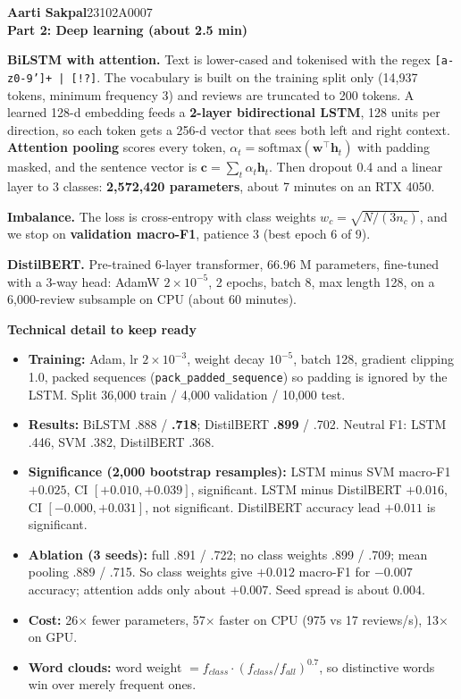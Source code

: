 \documentclass[10pt,a4paper]{article}
\newcommand{\lab}[1]{{\color{accent}\bfseries #1}}
\newcommand{\speaker}[3]{%
  \begin{tcolorbox}[colback=navy,colframe=navy,arc=3pt,left=8pt,right=8pt,top=4pt,bottom=4pt]
  {\color{white}\bfseries\Large #1}\hfill{\color{white!70!navy}\small #2}\\[1pt]{\color{accent!60!white}\bfseries #3}
  \end{tcolorbox}\vspace{-2pt}}
\begin{document}
\speaker{Aarti Sakpal}{23102A0007}{Part 2: Deep learning \quad (about 2.5 min)}
\begin{say}
\lab{BiLSTM with attention.} Text is lower-cased and tokenised with the regex \texttt{[a-z0-9']+ | [!?]}. The vocabulary is built on the training split only (14,937 tokens, minimum frequency 3) and reviews are truncated to 200 tokens. A learned 128-d embedding feeds a \textbf{2-layer bidirectional LSTM}, 128 units per direction, so each token gets a 256-d vector that sees both left and right context. \textbf{Attention pooling} scores every token, $\alpha_t=\mathrm{softmax}(\mathbf w^\top \mathbf h_t)$ with padding masked, and the sentence vector is $\mathbf c=\sum_t\alpha_t\mathbf h_t$. Then dropout 0.4 and a linear layer to 3 classes: \textbf{2,572,420 parameters}, about 7 minutes on an RTX 4050.\par
\lab{Imbalance.} The loss is cross-entropy with class weights $w_c=\sqrt{N/(3n_c)}$, and we stop on \textbf{validation macro-F1}, patience 3 (best epoch 6 of 9).\par
\lab{DistilBERT.} Pre-trained 6-layer transformer, 66.96 M parameters, fine-tuned with a 3-way head: AdamW $2\times10^{-5}$, 2 epochs, batch 8, max length 128, on a 6,000-review subsample on CPU (about 60 minutes).
\end{say}
\par\vspace{2pt}\textbf{Technical detail to keep ready}\par
\begin{itemize}
\item \textbf{Training:} Adam, lr $2\times10^{-3}$, weight decay $10^{-5}$, batch 128, gradient clipping 1.0, packed sequences (\texttt{pack\_padded\_\allowbreak sequence}) so padding is ignored by the LSTM. Split 36,000 train / 4,000 validation / 10,000 test.
\item \textbf{Results:} BiLSTM .888 / \textbf{.718}; DistilBERT \textbf{.899} / .702. Neutral F1: LSTM .446, SVM .382, DistilBERT .368.
\item \textbf{Significance (2,000 bootstrap resamples):} LSTM minus SVM macro-F1 $+0.025$, CI $[+0.010,+0.039]$, significant. LSTM minus DistilBERT $+0.016$, CI $[-0.000,+0.031]$, not significant. DistilBERT accuracy lead $+0.011$ is significant.
\item \textbf{Ablation (3 seeds):} full .891 / .722; no class weights .899 / .709; mean pooling .889 / .715. So class weights give $+0.012$ macro-F1 for $-0.007$ accuracy; attention adds only about $+0.007$. Seed spread is about 0.004.
\item \textbf{Cost:} 26$\times$ fewer parameters, 57$\times$ faster on CPU (975 vs 17 reviews/s), 13$\times$ on GPU.
\item \textbf{Word clouds:} word weight $=f_{class}\cdot(f_{class}/f_{all})^{0.7}$, so distinctive words win over merely frequent ones.
\end{itemize}
\end{document}
